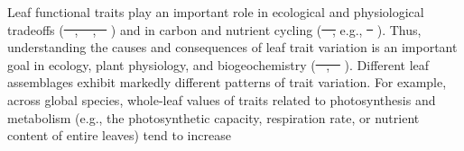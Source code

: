 \documentclass[
  12pt,
  letterpaper,
  DIV=11,
  numbers=noendperiod]{scrartcl}
\providecommand{\DIFadd}[1]{{\protect\color{blue}\uwave{#1}}} %
\providecommand{\DIFdel}[1]{{\protect\color{red}\sout{#1}}}                      %
\providecommand{\DIFaddbegin}{} %
\providecommand{\DIFaddend}{} %
\providecommand{\DIFdelbegin}{} %
\providecommand{\DIFdelend}{} %
\newcommand{\DIFscaledelfig}{0.5}
\newlength{\DIFdelgraphicswidth} %
\newlength{\DIFdelgraphicsheight} %
\newcommand{\DIFaddincludegraphics}[2][]{{\color{blue}\fbox{\DIFOincludegraphics[#1]{#2}}}} %
\newcommand{\DIFdelincludegraphics}[2][]{%
\sbox{\DIFdelgraphicsbox}{\DIFOincludegraphics[#1]{#2}}%
\settoboxwidth{\DIFdelgraphicswidth}{\DIFdelgraphicsbox} %
\settoboxtotalheight{\DIFdelgraphicsheight}{\DIFdelgraphicsbox} %
\scalebox{\DIFscaledelfig}{%
\parbox[b]{\DIFdelgraphicswidth}{\usebox{\DIFdelgraphicsbox}\\[-\baselineskip] \rule{\DIFdelgraphicswidth}{0em}}\llap{\resizebox{\DIFdelgraphicswidth}{\DIFdelgraphicsheight}{%
\setlength{\unitlength}{\DIFdelgraphicswidth}%
\begin{picture}(1,1)%
\thicklines\linethickness{2pt} %
{\color[rgb]{1,0,0}\put(0,0){\framebox(1,1){}}}%
{\color[rgb]{1,0,0}\put(0,0){\line( 1,1){1}}}%
{\color[rgb]{1,0,0}\put(0,1){\line(1,-1){1}}}%
\end{picture}%
}\hspace*{3pt}}} %
} %
\DeclareRobustCommand{\DIFaddbegin}{\DIFOaddbegin \let\includegraphics\DIFaddincludegraphics} %
\DeclareRobustCommand{\DIFaddend}{\DIFOaddend \let\includegraphics\DIFOincludegraphics} %
\DeclareRobustCommand{\DIFdelbegin}{\DIFOdelbegin \let\includegraphics\DIFdelincludegraphics} %
\DeclareRobustCommand{\DIFdelend}{\DIFOaddend \let\includegraphics\DIFOincludegraphics} %
\begin{document}
Leaf functional traits play an important role in ecological and
physiological tradeoffs (\DIFdelbegin \DIFdel{\mbox{%
\citeproc{ref-Wright2004a}{Wright et al. 2004}}\hspace{0pt}%
,
\mbox{%
\citeproc{ref-Reich2014}{Reich 2014}}\hspace{0pt}%
, \mbox{%
\citeproc{ref-Onoda2017}{Onoda et
al. 2017}}\hspace{0pt}%
}\DIFdelend \DIFaddbegin \DIFadd{\mbox{%
\citeproc{ref-Onoda2017}{Onoda et al., 2017}}\hspace{0pt}%
;
\mbox{%
\citeproc{ref-Reich2014}{Reich, 2014}}\hspace{0pt}%
; \mbox{%
\citeproc{ref-Wright2004a}{Wright
et al., 2004}}\hspace{0pt}%
}\DIFaddend ) and in carbon and nutrient cycling (\DIFdelbegin \DIFdel{\mbox{%
\citeproc{ref-Tcherkez2017}{Tcherkez et al. 2017}}\hspace{0pt}%
, }\DIFdelend e.g.,
\DIFdelbegin \DIFdel{\mbox{%
\citeproc{ref-Huntingford2017}{Huntingford et al. 2017}}\hspace{0pt}%
}\DIFdelend \DIFaddbegin \DIFadd{\mbox{%
\citeproc{ref-Huntingford2017}{Huntingford et al., 2017}}\hspace{0pt}%
;
\mbox{%
\citeproc{ref-Tcherkez2017}{Tcherkez et al., 2017}}\hspace{0pt}%
}\DIFaddend ). Thus, understanding
the causes and consequences of leaf trait variation is an important goal
in ecology, plant physiology, and biogeochemistry
(\DIFdelbegin \DIFdel{\mbox{%
\citeproc{ref-Bonan2002}{Bonan et al. 2002}}\hspace{0pt}%
,
\mbox{%
\citeproc{ref-Poorter2009}{Poorter et al. 2009}}\hspace{0pt}%
}\DIFdelend \DIFaddbegin \DIFadd{\mbox{%
\citeproc{ref-Bonan2002}{Bonan et al., 2002}}\hspace{0pt}%
;
\mbox{%
\citeproc{ref-Poorter2009}{Poorter et al., 2009}}\hspace{0pt}%
}\DIFaddend ). Different leaf
assemblages exhibit markedly different patterns of trait variation. For
example, across global species, whole-leaf values of traits related to
photosynthesis and metabolism (e.g., the photosynthetic capacity,
respiration rate, or nutrient content of entire leaves) tend to increase
\end{document}
